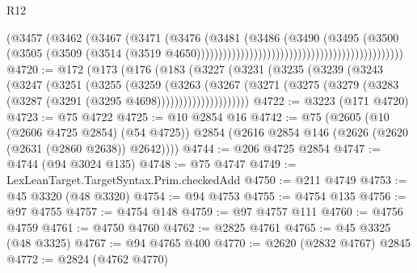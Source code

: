 \begin{lexlean}{R12}
\begin{coremodule}
{{{{{{{{{{{{{{{{{{{{{{{{{{{{{{{{{{{{{{{{{{{{{{{{{{{{{{{{{{{{{{{{{{{{{{{{{{{{{{{{{{                                                                      (@3457
                                                                        (@3462
                                                                          (@3467
                                                                            (@3471
                                                                              (@3476
                                                                                (@3481
                                                                                  (@3486
                                                                                    (@3490
                                                                                      (@3495
                                                                                        (@3500
                                                                                          (@3505
                                                                                            (@3509
                                                                                              (@3514
                                                                                                (@3519
                                                                                                  @4650)))))))))))))))))))))))))))))))))))))))))))))))
@4720 := @172
    (@173
      (@176
        (@183
          (@3227
            (@3231
              (@3235
                (@3239
                  (@3243
                    (@3247
                      (@3251
                        (@3255
                          (@3259
                            (@3263
                              (@3267
                                (@3271
                                  (@3275
                                    (@3279 (@3283 (@3287 (@3291 (@3295 @4698)))))))))))))))))))))
@4722 := @3223 (@171 @4720)
@4723 := @75 @4722
@4725 := @10 @2854 @16
@4742 := @75
    (@2605
      (@10 (@2606 @4725 @2854) (@54 @4725))
      @2854
      (@2616 @2854 @146 (@2626 (@2620 (@2631 (@2860 @2638)) @2642))))
@4744 := @206 @4725 @2854
@4747 := @4744 (@94 @3024 @135)
@4748 := @75 @4747
@4749 := LexLeanTarget.TargetSyntax.Prim.checkedAdd
@4750 := @211 @4749
@4753 := @45 @3320 (@48 @3320)
@4754 := @94 @4753
@4755 := @4754 @135
@4756 := @97 @4755
@4757 := @4754 @148
@4759 := @97 @4757 @111
@4760 := @4756 @4759
@4761 := @4750 @4760
@4762 := @2825 @4761
@4765 := @45 @3325 (@48 @3325)
@4767 := @94 @4765 @400
@4770 := @2620 (@2832 @4767) @2845
@4772 := @2824 (@4762 @4770)
}}}}}}}}}}}}}}}}}}}}}}}}}}}}}}}}}}}}}}}}}}}}}}}}}}}}}}}}}}}}}}}}}}}}}}}}}}}}}}}}}}
\end{coremodule}
\end{lexlean}
